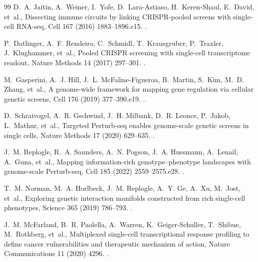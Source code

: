 \documentclass[a4paper,fleqn]{cas-sc}
\begin{document}
\begin{thebibliography}{99}
D.~A. Jaitin, A.~Weiner, I.~Yofe, D.~Lara-Astiaso, H.~Keren-Shaul, E.~David, et~al., Dissecting immune circuits by linking {CRISPR}-pooled screens with single-cell {RNA-seq}, Cell 167 (2016) 1883--1896.e15.
\newblock \href {https://doi.org/10.1016/j.cell.2016.11.039} {}.

P.~Datlinger, A.~F. Rendeiro, C.~Schmidl, T.~Krausgruber, P.~Traxler, J.~Klughammer, et~al., Pooled {CRISPR} screening with single-cell transcriptome readout, Nature Methods 14 (2017) 297--301.
\newblock \href {https://doi.org/10.1038/nmeth.4177} {}.

M.~Gasperini, A.~J. Hill, J.~L. McFaline-Figueroa, B.~Martin, S.~Kim, M.~D. Zhang, et~al., A genome-wide framework for mapping gene regulation via cellular genetic screens, Cell 176 (2019) 377--390.e19.
\newblock \href {https://doi.org/10.1016/j.cell.2018.11.029} {}.

D.~Schraivogel, A.~R. Gschwind, J.~H. Milbank, D.~R. Leonce, P.~Jakob, L.~Mathur, et~al., Targeted {Perturb-seq} enables genome-scale genetic screens in single cells, Nature Methods 17 (2020) 629--635.
\newblock \href {https://doi.org/10.1038/s41592-020-0837-5} {}.

J.~M. Replogle, R.~A. Saunders, A.~N. Pogson, J.~A. Hussmann, A.~Lenail, A.~Guna, et~al., Mapping information-rich genotype--phenotype landscapes with genome-scale {Perturb-seq}, Cell 185 (2022) 2559--2575.e28.
\newblock \href {https://doi.org/10.1016/j.cell.2022.05.013} {}.

T.~M. Norman, M.~A. Horlbeck, J.~M. Replogle, A.~Y. Ge, A.~Xu, M.~Jost, et~al., Exploring genetic interaction manifolds constructed from rich single-cell phenotypes, Science 365 (2019) 786--793.
\newblock \href {https://doi.org/10.1126/science.aax4438} {}.

J.~M. McFarland, B.~R. Paolella, A.~Warren, K.~Geiger-Schuller, T.~Shibue, M.~Rothberg, et~al., Multiplexed single-cell transcriptional response profiling to define cancer vulnerabilities and therapeutic mechanism of action, Nature Communications 11 (2020) 4296.
\newblock \href {https://doi.org/10.1038/s41467-020-17440-w} {}.


\end{thebibliography}
\end{document}
